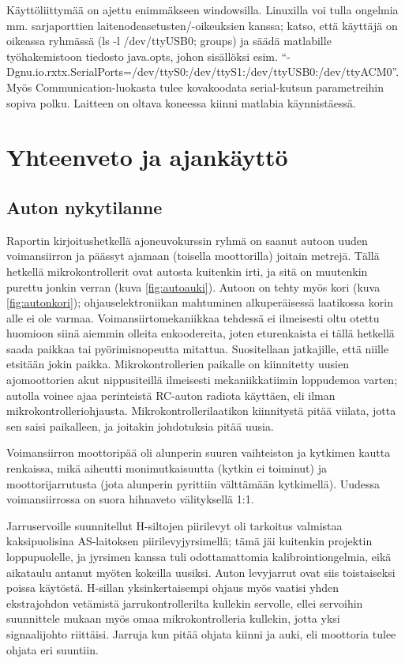 \documentclass{article}
\begin{document}
Käyttöliittymää on ajettu enimmäkseen windowsilla. Linuxilla voi tulla ongelmia mm. sarjaporttien laitenodeasetusten/-oikeuksien kanssa; katso, että käyttäjä on oikeassa ryhmässä (ls -l /dev/ttyUSB0; groups) ja säädä matlabille työhakemistoon tiedosto java.opts, johon sisällöksi esim. ``-Dgnu.io.rxtx.SerialPorts=/dev/ttyS0:/dev/ttyS1:/dev/ttyUSB0:/dev/ttyACM0''. Myös Communication-luokasta tulee kovakoodata serial-kutsun parametreihin sopiva polku. Laitteen on oltava koneessa kiinni matlabia käynnistäessä.

\section{Yhteenveto ja ajankäyttö}

\subsection{Auton nykytilanne}
Raportin kirjoitushetkellä ajoneuvokurssin ryhmä on saanut autoon uuden voimansiirron ja päässyt ajamaan (toisella moottorilla) joitain metrejä. Tällä hetkellä mikrokontrollerit ovat autosta kuitenkin irti, ja sitä on muutenkin purettu jonkin verran (kuva \ref{fig:autoauki}). Autoon on tehty myös kori (kuva \ref{fig:autonkori}); ohjauselektroniikan mahtuminen alkuperäisessä laatikossa korin alle ei ole varmaa. Voimansiirtomekaniikkaa tehdessä ei ilmeisesti oltu otettu huomioon siinä aiemmin olleita enkoodereita, joten eturenkaista ei tällä hetkellä saada paikkaa tai pyörimisnopeutta mitattua. Suositellaan jatkajille, että niille etsitään jokin paikka. Mikrokontrollerien paikalle on kiinnitetty uusien ajomoottorien akut nippusiteillä ilmeisesti mekaniikkatiimin loppudemoa varten; autolla voinee ajaa perinteistä RC-auton radiota käyttäen, eli ilman mikrokontrolleriohjausta. Mikrokontrollerilaatikon kiinnitystä pitää viilata, jotta sen saisi paikalleen, ja joitakin johdotuksia pitää uusia.

Voimansiirron moottoripää oli alunperin suuren vaihteiston ja kytkimen kautta renkaissa, mikä aiheutti monimutkaisuutta (kytkin ei toiminut) ja moottorijarrutusta (jota alunperin pyrittiin välttämään kytkimellä). Uudessa voimansiirrossa on suora hihnaveto välityksellä 1:1.

Jarruservoille suunnitellut H-siltojen piirilevyt oli tarkoitus valmistaa kaksipuolisina AS-laitoksen piirilevyjyrsimellä; tämä jäi kuitenkin projektin loppupuolelle, ja jyrsimen kanssa tuli odottamattomia kalibrointiongelmia, eikä aikataulu antanut myöten kokeilla uusiksi. Auton levyjarrut ovat siis toistaiseksi poissa käytöstä. H-sillan yksinkertaisempi ohjaus myös vaatisi yhden ekstrajohdon vetämistä jarrukontrollerilta kullekin servolle, ellei servoihin suunnittele mukaan myös omaa mikrokontrolleria kullekin, jotta yksi signaalijohto riittäisi. Jarruja kun pitää ohjata kiinni ja auki, eli moottoria tulee ohjata eri suuntiin.
\end{document}
